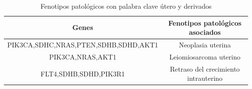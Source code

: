 \begin{table}[h]
	\centering
	\caption{Fenotipos patológicos con palabra clave útero y derivados}
	\begin{tabular}{|c|c|}
		\hline
		\textbf{Genes} & \textbf{Fenotipos patológicos asociados} \\
		\hline
		PIK3CA,SDHC,NRAS,PTEN,SDHB,SDHD,AKT1 & Neoplasia uterina \\
		\hline
		PIK3CA,NRAS,AKT1 & Leiomiosarcoma uterino \\
		\hline
		FLT4,SDHB,SDHD,PIK3R1 & Retraso del crecimiento intrauterino \\
		\hline
	\end{tabular}
\end{table}
\clearpage
